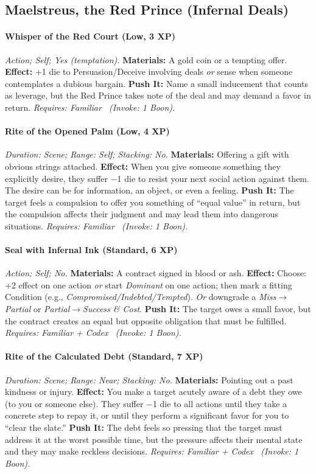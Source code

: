 \subsection{Maelstreus, the Red Prince (Infernal Deals)}
\paragraph{Whisper of the Red Court (Low, 3 XP)} \emph{Action; Self; Yes (temptation).}
\textbf{Materials:} A gold coin or a tempting offer.
\textbf{Effect:} +1 die to Persuasion/Deceive involving deals \emph{or} sense when someone contemplates a dubious bargain.
\textbf{Push It:} Name a small inducement that counts as leverage, but the Red Prince takes note of the deal and may demand a favor in return.
\emph{Requires: Familiar \ (\textit{Invoke:} 1 Boon).}
\paragraph{Rite of the Opened Palm (Low, 4 XP)} \emph{Duration: Scene; Range: Self; Stacking: No.}
\textbf{Materials:} Offering a gift with obvious strings attached.
\textbf{Effect:} When you give someone something they explicitly desire, they suffer −1 die to resist your next social action against them. The desire can be for information, an object, or even a feeling.
\textbf{Push It:} The target feels a compulsion to offer you something of ``equal value'' in return, but the compulsion affects their judgment and may lead them into dangerous situations.
\emph{Requires: Familiar \ (\textit{Invoke:} 1 Boon).}

\paragraph{Seal with Infernal Ink (Standard, 6 XP)} \emph{Action; Self; No.}
\textbf{Materials:} A contract signed in blood or ash.
\textbf{Effect:} Choose: +2 effect on one action \emph{or} start \emph{Dominant} on one action; then mark a fitting Condition (e.g., \emph{Compromised/Indebted/Tempted}). \emph{Or} downgrade a \emph{Miss}$\rightarrow$\emph{Partial} or \emph{Partial}$\rightarrow$\emph{Success \& Cost}.
\textbf{Push It:} The target owes a small favor, but the contract creates an equal but opposite obligation that must be fulfilled.
\emph{Requires: Familiar + Codex \ (\textit{Invoke:} 1 Boon).}
\paragraph{Rite of the Calculated Debt (Standard, 7 XP)} \emph{Duration: Scene; Range: Near; Stacking: No.}
\textbf{Materials:} Pointing out a past kindness or injury.
\textbf{Effect:} You make a target acutely aware of a debt they owe (to you or someone else). They suffer −1 die to all actions until they take a concrete step to repay it, or until they perform a significant favor for you to ``clear the slate.''
\textbf{Push It:} The debt feels so pressing that the target must address it at the worst possible time, but the pressure affects their mental state and they may make reckless decisions.
\emph{Requires: Familiar + Codex \ (\textit{Invoke:} 1 Boon).}
